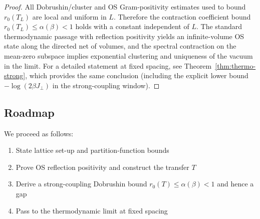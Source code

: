 \documentclass[11pt]{amsart}
\theoremstyle{plain}
\theoremstyle{definition}
\theoremstyle{remark}
\begin{document}
\begin{proof}
All Dobrushin/cluster and OS Gram-positivity estimates used to bound $r_0(T_L)$ are local and uniform in $L$. Therefore the contraction coefficient bound $r_0(T_L)\le \alpha(\beta)<1$ holds with a constant independent of $L$. The standard thermodynamic passage with reflection positivity yields an infinite-volume OS state along the directed net of volumes, and the spectral contraction on the mean-zero subspace implies exponential clustering and uniqueness of the vacuum in the limit. For a detailed statement at fixed spacing, see Theorem~\ref{thm:thermo-strong}, which provides the same conclusion (including the explicit lower bound $-\log(2\beta J_{\perp})$ in the strong-coupling window).
\end{proof}

\subsection{Roadmap}

We proceed as follows:
\begin{enumerate}[label=\textbf{(\roman*)}, leftmargin=2em, itemsep=4pt]
  \item State lattice set-up and partition-function bounds
  \item Prove OS reflection positivity and construct the transfer $T$
  \item Derive a strong-coupling Dobrushin bound $r_0(T)\le \alpha(\beta)<1$ and hence a gap
  \item Pass to the thermodynamic limit at fixed spacing
\end{enumerate}
\end{document}
